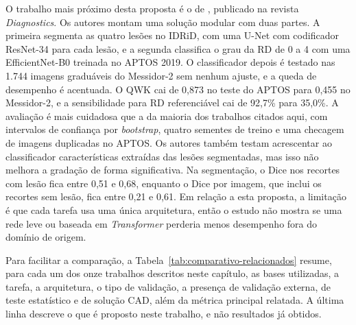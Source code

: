 O trabalho mais próximo desta proposta é o de , publicado na revista \textit{Diagnostics}. Os autores montam uma solução modular com duas partes. A primeira segmenta as quatro lesões no IDRiD, com uma U-Net com codificador ResNet-34 para cada lesão, e a segunda classifica o grau da RD de 0 a 4 com uma EfficientNet-B0 treinada no APTOS 2019. O classificador depois é testado nas 1.744 imagens graduáveis do Messidor-2 sem nenhum ajuste, e a queda de desempenho é acentuada. O QWK cai de 0,873 no teste do APTOS para 0,455 no Messidor-2, e a sensibilidade para RD referenciável cai de 92,7\% para 35,0\%. A avaliação é mais cuidadosa que a da maioria dos trabalhos citados aqui, com intervalos de confiança por \textit{bootstrap}, quatro sementes de treino e uma checagem de imagens duplicadas no APTOS. Os autores também testam acrescentar ao classificador características extraídas das lesões segmentadas, mas isso não melhora a gradação de forma significativa. Na segmentação, o Dice nos recortes com lesão fica entre 0,51 e 0,68, enquanto o Dice por imagem, que inclui os recortes sem lesão, fica entre 0,21 e 0,61. Em relação a esta proposta, a limitação é que cada tarefa usa uma única arquitetura, então o estudo não mostra se uma rede leve ou baseada em \textit{Transformer} perderia menos desempenho fora do domínio de origem.

Para facilitar a comparação, a Tabela~\ref{tab:comparativo-relacionados} resume, para cada um dos onze trabalhos descritos neste capítulo, as bases utilizadas, a tarefa, a arquitetura, o tipo de validação, a presença de validação externa, de teste estatístico e de solução CAD, além da métrica principal relatada. A última linha descreve o que é proposto neste trabalho, e não resultados já obtidos.

